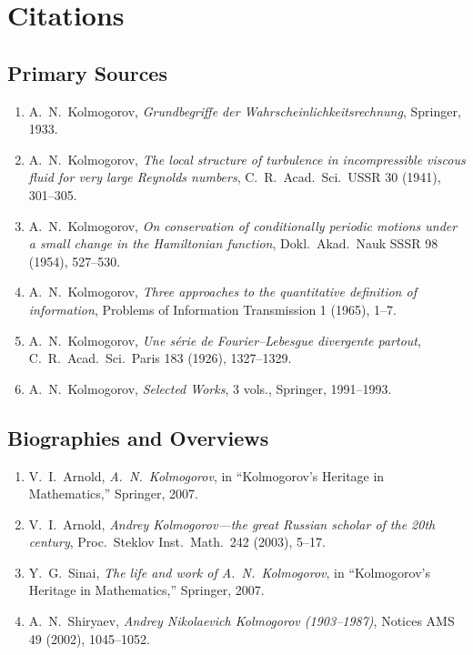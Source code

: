 \section{Citations}\subsection*{Primary Sources}
\begin{enumerate}
    \item A.\ N.\ Kolmogorov, \textit{Grundbegriffe der Wahrscheinlichkeitsrechnung}, Springer, 1933.
    \item A.\ N.\ Kolmogorov, \textit{The local structure of turbulence in incompressible viscous fluid for very large Reynolds numbers}, C.\ R.\ Acad.\ Sci.\ USSR 30 (1941), 301--305.
    \item A.\ N.\ Kolmogorov, \textit{On conservation of conditionally periodic motions under a small change in the Hamiltonian function}, Dokl.\ Akad.\ Nauk SSSR 98 (1954), 527--530.
    \item A.\ N.\ Kolmogorov, \textit{Three approaches to the quantitative definition of information}, Problems of Information Transmission 1 (1965), 1--7.
    \item A.\ N.\ Kolmogorov, \textit{Une s{\'e}rie de Fourier--Lebesgue divergente partout}, C.\ R.\ Acad.\ Sci.\ Paris 183 (1926), 1327--1329.
    \item A.\ N.\ Kolmogorov, \textit{Selected Works}, 3 vols., Springer, 1991--1993.
\end{enumerate}

\subsection*{Biographies and Overviews}
\begin{enumerate}
    \item V.\ I.\ Arnold, \textit{A.\ N.\ Kolmogorov}, in ``Kolmogorov's Heritage in Mathematics,'' Springer, 2007.
    \item V.\ I.\ Arnold, \textit{Andrey Kolmogorov---the great Russian scholar of the 20th century}, Proc.\ Steklov Inst.\ Math.\ 242 (2003), 5--17.
    \item Y.\ G.\ Sinai, \textit{The life and work of A.\ N.\ Kolmogorov}, in ``Kolmogorov's Heritage in Mathematics,'' Springer, 2007.
    \item A.\ N.\ Shiryaev, \textit{Andrey Nikolaevich Kolmogorov (1903--1987)}, Notices AMS 49 (2002), 1045--1052.
\end{enumerate}

